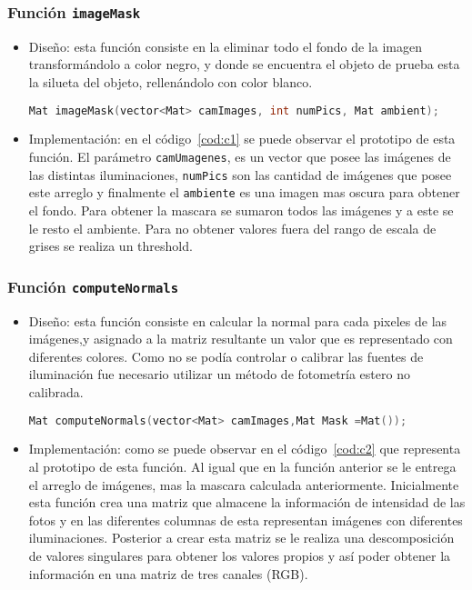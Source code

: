 \documentclass[twocolumn,11pts]{IEEEtran}
\begin{document}
\subsubsection{Función \texttt{imageMask}}
\begin{itemize}
\item Diseño: esta función consiste en la eliminar todo el fondo de la imagen transformándolo a color negro, y  donde se encuentra el objeto de prueba esta la silueta del objeto, rellenándolo con color blanco.
\begin{lstlisting}[float,language=C++,caption={Prototipo función \texttt{imageMask}.},label=cod:c1]
Mat imageMask(vector<Mat> camImages, int numPics, Mat ambient);
\end{lstlisting}
\item Implementación: en el código~\ref{cod:c1} se puede observar el prototipo de esta función. El parámetro \texttt{camUmagenes}, es un vector que posee las imágenes de las distintas iluminaciones, \texttt{numPics} son las cantidad de imágenes que posee este arreglo y finalmente el \texttt{ambiente} es una imagen mas oscura para obtener el fondo. Para obtener la mascara se sumaron todos las imágenes y a este se le resto el ambiente. Para no obtener valores fuera del rango de escala de grises se realiza un threshold.


\end{itemize}
\subsubsection{Función \texttt{computeNormals}}
\begin{itemize}
\item Diseño: esta función consiste en calcular la normal para cada pixeles de las imágenes,y asignado  a la matriz resultante un valor que es representado con diferentes colores. Como no se podía controlar o calibrar las fuentes de iluminación fue necesario utilizar un método de fotometría estero no calibrada. 
\begin{lstlisting}[float,language=C++,caption={Prototipo función \texttt{computeNormals}.},label=cod:c2]
Mat computeNormals(vector<Mat> camImages,Mat Mask =Mat());
\end{lstlisting}
\item Implementación: como se puede observar en el código~\ref{cod:c2} que representa al prototipo de esta función. Al igual que en la función anterior se le entrega el arreglo de imágenes, mas la mascara calculada anteriormente. Inicialmente esta función crea una matriz que almacene la información de intensidad de las fotos y en las diferentes columnas de esta representan imágenes con diferentes iluminaciones. Posterior a crear esta matriz se le realiza una descomposición de valores singulares para obtener los valores propios y así poder obtener la información en una matriz de tres canales (RGB).
\end{itemize}
\end{document}
